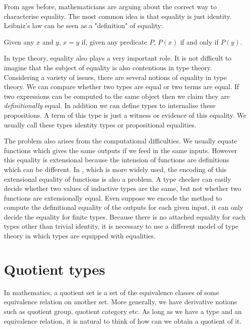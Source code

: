 From ages before, mathematicians are arguing about the correct way to
characterise equality. The most common idea is that equality is just
identity. Leibniz's law can be seen as a "definition" of
equality:

Given any $x$ and $y$, $x = y$ if, given any predicate $P$, $P(x)$ if and only
if $P(y)$.

In type theory, equality also plays a very important role.
It is not difficult to imagine that the subject of equality is also
contentious in type theory. Considering a variety of issues, there are
several notions of equality in type theory.
We can compare whether two types are equal or two terms are equal. If two
expressions can be computed to the same object then we claim they are
 \emph{definitionally} equal.  In addition we can define types to
 internalise these propositions. A term of this type is just a witness or evidence of
 this equality. We usually call these types identity types or
 propositional equalities.

The problem also arises from the computational difficulties. We
usually equate functions which gives the same outputs if we feed in the
same inputs. However this equality is extensional because the intension
of functions are definitions which can be different. In \itt, which is
more widely used, the encoding of this extensional equality of
functions is also a problem. A type checker can easily decide whether two
values of inductive types are the same, but not whether two functions
are extensionally equal. Even suppose we encode the method to compute
the definitional equality of the outputs for each given input, it can
only decide the equality for finite types. Because there is no
attached equality for each types other than trivial identity, it is
necessary to use a different model of type theory in which types are
equipped with equalities.

\section{Quotient types}


In mathematics, a quotient set is a set of the equivalence classes of
some equivalence relation on another set. More generally, we have
derivative notions such as quotient group, quotient category etc. As
long as we have a type and an equivalence relation, it is natural to
think of how can we obtain a quotient of it.




